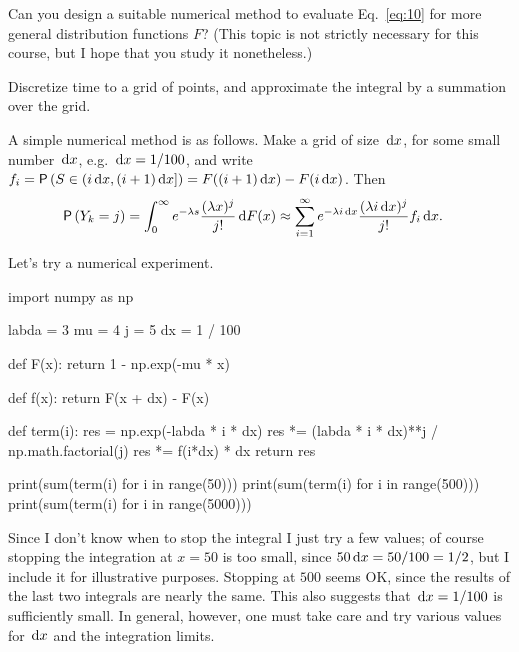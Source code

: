 \begin{exercise}
  Can you design a suitable numerical method to evaluate   Eq.~\eqref{eq:10} for more 
  general distribution functions $F$? (This topic is not strictly necessary for this course, but I hope that you study it nonetheless.)
\begin{hint}
Discretize time to  a grid of points, and   approximate the integral by a summation over the grid.
\end{hint}
  \begin{solution}
  A simple numerical method is as follows. Make a grid of
  size $\,\text{d}x$, for some small number $\,\text{d}x$, e.g. $\,\text{d}x=1/100$, and write
  $f_i = \P{S\in(i\d x, (i+1)\d x]} = F((i+1)\d x) - F(i\d x)$. Then 
  \begin{equation*}
    \begin{split}
  \P{Y_k = j} 
&= \int_0^\infty e^{-\lambda s}\frac{(\lambda x)^j}{j!} \d F(x) 
\approx \sum_{i=1}^\infty e^{-\lambda i \d x}\frac{(\lambda i\d x)^j}{j!} f_i \d x.
    \end{split}
\end{equation*}

Let's try a numerical experiment. 

\begin{pyconsole}
import numpy as np

labda = 3
mu = 4
j = 5
dx = 1 / 100


def F(x):
    return 1 - np.exp(-mu * x)


def f(x):
    return F(x + dx) - F(x)


def term(i):
    res = np.exp(-labda * i * dx)
    res *= (labda * i * dx)**j / np.math.factorial(j)
    res *= f(i*dx) * dx
    return res

\end{pyconsole}

\begin{pyconsole}
print(sum(term(i) for i in range(50)))
print(sum(term(i) for i in range(500)))
print(sum(term(i) for i in range(5000)))
\end{pyconsole}

Since I don't know when to stop the integral I just try a few values;
of course stopping the integration at $x=50$ is too small, since
$50\,\text{d}x=50/100=1/2$, but I include it for illustrative
purposes. Stopping at $500$ seems OK, since the results of the last
two integrals are nearly the same. This also suggests that
$\,\text{d}x=1/100$ is sufficiently small. In general, however, one must take
care and try various values for $\,\text{d}x$ and the integration limits.



\end{solution}
\end{exercise}
